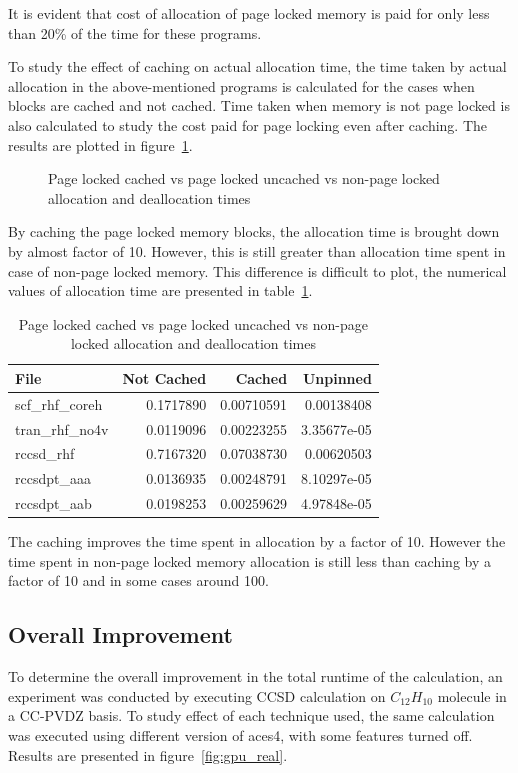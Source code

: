 It is evident that cost of allocation of page locked memory is
paid for only less than 20\% of the time for these programs.

To study the effect of caching on actual allocation time, the time taken by actual
allocation in the above-mentioned programs is calculated for the cases when blocks
are cached and not cached. Time taken when memory is not page locked is
also calculated to study the cost paid for page locking even after caching.
The results are plotted in figure~\ref{fig:mempin_caching}.

\begin{figure}[h]
  
  \caption{Page locked cached vs page locked uncached vs non-page locked allocation
  and deallocation times}
  \label{fig:mempin_caching}
\end{figure}

By caching the page locked memory blocks, the allocation time is brought down by
almost factor of 10. However, this is still greater than allocation time spent in
case of non-page locked memory. This difference is difficult to plot, the numerical
values of allocation time are presented in table~\ref{tab:mempin_caching}.

\begin{table}[h]
  \centering
  \caption{Page locked cached vs page locked uncached vs non-page locked allocation
  and deallocation times}
  \begin{tabular}{l r r r}
    \hline
    File            & Not Cached & Cached     & Unpinned    \\
    \hline
    scf\_rhf\_coreh & 0.1717890  & 0.00710591 & 0.00138408  \\
    tran\_rhf\_no4v & 0.0119096  & 0.00223255 & 3.35677e-05 \\
    rccsd\_rhf      & 0.7167320  & 0.07038730 & 0.00620503  \\
    rccsdpt\_aaa    & 0.0136935  & 0.00248791 & 8.10297e-05 \\
    rccsdpt\_aab    & 0.0198253  & 0.00259629 & 4.97848e-05 \\
    \hline
  \end{tabular}
  \label{tab:mempin_caching}
\end{table}

The caching improves the time spent in allocation by a factor of 10. However the time
spent in non-page locked memory allocation is still less than caching by a factor
of 10 and in some cases around 100.

\subsection{Overall Improvement}
To determine the overall improvement in the total runtime of the calculation, an
experiment was conducted by executing CCSD calculation on $C_{12}H_{10}$ molecule
in a CC-PVDZ basis. To study effect of each technique used, the same calculation
was executed using different version of aces4, with some features turned off. Results
are presented in figure~\ref{fig:gpu_real}.

